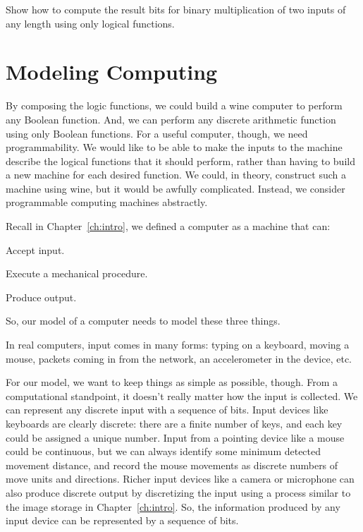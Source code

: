 \begin{schemeregion}
\beforeex
\begin{exercise} \goldstar 
Show how to compute the result bits for binary multiplication of two inputs of any length using only logical functions.
\solution{\LATER{}}
\end{exercise}
\afterex

\section{Modeling Computing}\label{sec:modeling}

By composing the logic functions, we could build a wine computer to perform any Boolean function.  And, we can perform any discrete arithmetic function using only Boolean functions.  For a useful computer, though, we need programmability.  We would like to be able to make the inputs to the machine describe the logical functions that it should perform, rather than having to build a new machine for each desired function.  We could, in theory, construct such a machine using wine, but it would be awfully complicated.  Instead, we consider programmable computing machines abstractly. 

Recall in Chapter~\ref{ch:intro}, we defined a computer as a machine that can:
\begin{enumtight}
\item Accept input.  
\item Execute a mechanical procedure. 
\item Produce output.
\end{enumtight}
So, our model of a computer needs to model these three things.  

 In real computers, input comes in many forms: typing on a keyboard, moving a mouse, packets coming in from the network, an accelerometer in the device, etc.  


For our model, we want to keep things as simple as possible, though.  From a computational standpoint, it doesn't really matter how the input is collected.  We can represent any discrete input with a sequence of bits.  Input devices like keyboards are clearly discrete: there are a finite number of keys, and each key could be assigned a unique number.  Input from a pointing device like a mouse could be continuous, but we can always identify some minimum detected movement distance, and record the mouse movements as discrete numbers of move units and directions.  Richer input devices like a camera or microphone can also produce discrete output by discretizing the input using a process similar to the image storage in Chapter~\ref{ch:intro}.  So, the information produced by any input device can be represented by a sequence of bits.  


\end{schemeregion}
